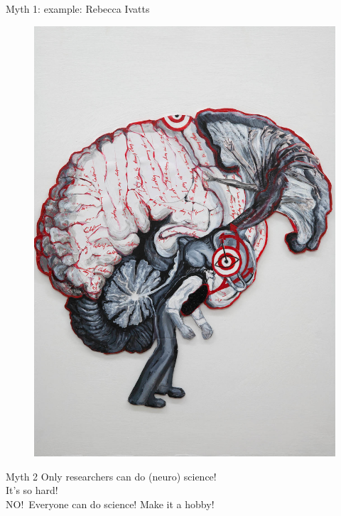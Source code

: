 \begin{frame}[c]{Myth 1: example: Rebecca Ivatts }
  \begin{figure}[h]
    \centering
    \includegraphics[height=0.8\textheight]{images/rebeccaivatts-dementia.jpg}
  \end{figure}
\end{frame}
\begin{frame}[c]{Myth 2}
  Only researchers can do (neuro) science!\\
  It's so hard!\\
  \vspace{0.5cm}
  \pause{}
  NO!\ Everyone can do science! Make it a hobby!
\end{frame}

